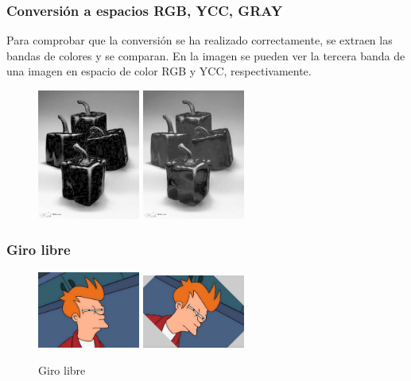 \subsubsection{Conversión a espacios RGB, YCC, GRAY}
Para comprobar que la conversión se ha realizado correctamente, se extraen las bandas de colores y se comparan. En la imagen se pueden ver la tercera banda de una imagen en espacio de color RGB y YCC, respectivamente.
\vskip0.3cm
\begin{figure}[H]
 \centering
  \includegraphics[width=0.3\textwidth]{imagenes/banda3RGB.jpg}
  \includegraphics[width=0.3\textwidth]{imagenes/banda3YCC.jpg}
 \caption{}
 \label{diseño}
\end{figure}
\subsubsection{Giro libre}
\vskip0.3cm
\begin{figure}[H]
 \centering
  \includegraphics[width=0.3\textwidth]{imagenes/Fry.jpg}
  \includegraphics[width=0.3\textwidth]{imagenes/fryGiro.jpg}
 \caption{Giro libre}
 \label{diseño}
\end{figure}
